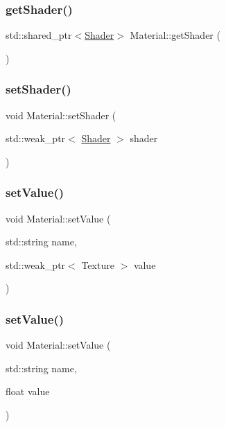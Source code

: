 \subsubsection{\texorpdfstring{get\+Shader()}{getShader()}}
{\footnotesize\ttfamily std\+::shared\+\_\+ptr$<$\hyperlink{class_shader}{Shader}$>$ Material\+::get\+Shader (\begin{DoxyParamCaption}{ }\end{DoxyParamCaption})}

\mbox{\label{class_material_af22f2c958c2bc0f1e34f0b965df7bc6f}} 
\subsubsection{\texorpdfstring{set\+Shader()}{setShader()}}
{\footnotesize\ttfamily void Material\+::set\+Shader (\begin{DoxyParamCaption}\item[{std\+::weak\+\_\+ptr$<$ \hyperlink{class_shader}{Shader} $>$}]{shader }\end{DoxyParamCaption})}

\mbox{\label{class_material_a73831d8a1a14e3987af00278c43f15d5}} 
\subsubsection{\texorpdfstring{set\+Value()}{setValue()}\hspace{0.1cm}{\footnotesize\ttfamily [1/2]}}
{\footnotesize\ttfamily void Material\+::set\+Value (\begin{DoxyParamCaption}\item[{std\+::string}]{name,  }\item[{std\+::weak\+\_\+ptr$<$ Texture $>$}]{value }\end{DoxyParamCaption})}

\mbox{\label{class_material_a051524839454843ed6f41ddc19da7704}} 
\subsubsection{\texorpdfstring{set\+Value()}{setValue()}\hspace{0.1cm}{\footnotesize\ttfamily [2/2]}}
{\footnotesize\ttfamily void Material\+::set\+Value (\begin{DoxyParamCaption}\item[{std\+::string}]{name,  }\item[{float}]{value }\end{DoxyParamCaption})}



